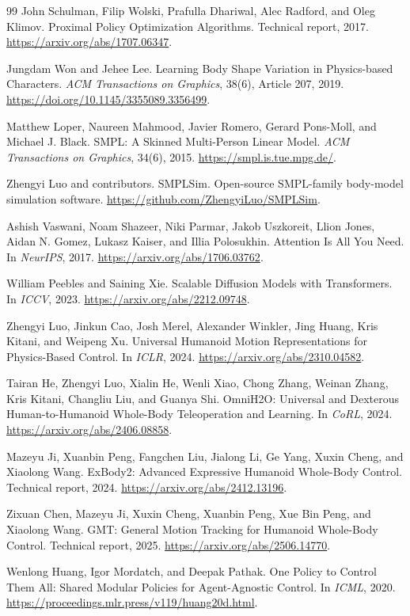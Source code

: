 \documentclass[11pt]{article}
\begin{document}
\begin{thebibliography}{99}
John Schulman, Filip Wolski, Prafulla Dhariwal, Alec Radford, and Oleg Klimov.
Proximal Policy Optimization Algorithms.
Technical report, 2017.
\url{https://arxiv.org/abs/1707.06347}.

Jungdam Won and Jehee Lee.
Learning Body Shape Variation in Physics-based Characters.
\emph{ACM Transactions on Graphics}, 38(6), Article 207, 2019.
\url{https://doi.org/10.1145/3355089.3356499}.

Matthew Loper, Naureen Mahmood, Javier Romero, Gerard Pons-Moll,
and Michael J. Black.
SMPL: A Skinned Multi-Person Linear Model.
\emph{ACM Transactions on Graphics}, 34(6), 2015.
\url{https://smpl.is.tue.mpg.de/}.

Zhengyi Luo and contributors.
SMPLSim.
Open-source SMPL-family body-model simulation software.
\url{https://github.com/ZhengyiLuo/SMPLSim}.

Ashish Vaswani, Noam Shazeer, Niki Parmar, Jakob Uszkoreit, Llion Jones,
Aidan N. Gomez, Lukasz Kaiser, and Illia Polosukhin.
Attention Is All You Need.
In \emph{NeurIPS}, 2017.
\url{https://arxiv.org/abs/1706.03762}.

William Peebles and Saining Xie.
Scalable Diffusion Models with Transformers.
In \emph{ICCV}, 2023.
\url{https://arxiv.org/abs/2212.09748}.

Zhengyi Luo, Jinkun Cao, Josh Merel, Alexander Winkler, Jing Huang,
Kris Kitani, and Weipeng Xu.
Universal Humanoid Motion Representations for Physics-Based Control.
In \emph{ICLR}, 2024.
\url{https://arxiv.org/abs/2310.04582}.

Tairan He, Zhengyi Luo, Xialin He, Wenli Xiao, Chong Zhang, Weinan Zhang,
Kris Kitani, Changliu Liu, and Guanya Shi.
OmniH2O: Universal and Dexterous Human-to-Humanoid Whole-Body
Teleoperation and Learning.
In \emph{CoRL}, 2024.
\url{https://arxiv.org/abs/2406.08858}.

Mazeyu Ji, Xuanbin Peng, Fangchen Liu, Jialong Li, Ge Yang, Xuxin Cheng,
and Xiaolong Wang.
ExBody2: Advanced Expressive Humanoid Whole-Body Control.
Technical report, 2024.
\url{https://arxiv.org/abs/2412.13196}.

Zixuan Chen, Mazeyu Ji, Xuxin Cheng, Xuanbin Peng, Xue Bin Peng,
and Xiaolong Wang.
GMT: General Motion Tracking for Humanoid Whole-Body Control.
Technical report, 2025.
\url{https://arxiv.org/abs/2506.14770}.

Wenlong Huang, Igor Mordatch, and Deepak Pathak.
One Policy to Control Them All: Shared Modular Policies for
Agent-Agnostic Control.
In \emph{ICML}, 2020.
\url{https://proceedings.mlr.press/v119/huang20d.html}.

\end{thebibliography}
\end{document}
